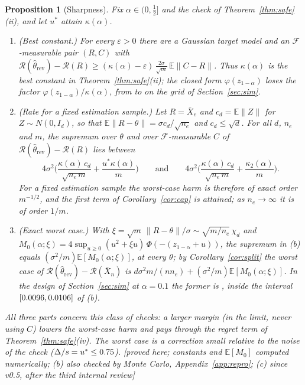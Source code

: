 \documentclass[10pt,a4paper]{article}
\theoremstyle{plain}
\newtheorem{proposition}[theorem]{Proposition}
\theoremstyle{definition}
\theoremstyle{remark}
\newcommand{\E}{\mathbb{E}}
\newcommand{\risk}{\mathcal{R}}
\newcommand{\rev}{\mathrm{rev}}
\newcommand{\norm}[1]{\lVert #1\rVert}
\newcommand{\status}[1]{\textsf{\small [#1]}}
\begin{document}
\begin{proposition}[Sharpness]\label{prop:sharp}
Fix $\alpha\in(0,\tfrac12]$ and the check of Theorem~\ref{thm:safe}(ii), and let $u^\ast$ attain $\kappa(\alpha)$.
\begin{enumerate}[leftmargin=2em,label=(\alph*)]
\item \textup{(Best constant.)} For every $\varepsilon>0$ there are a Gaussian target model and an $\mathcal F$-measurable pair $(R,C)$ with $\risk(\hat\theta_\rev)-\risk(R)\ge(\kappa(\alpha)-\varepsilon)\,\frac{2\sigma}{\sqrt m}\,\E\norm{C-R}$. Thus $\kappa(\alpha)$ is the best constant in Theorem~\ref{thm:safe}(ii); the closed form $\varphi(z_{1-\alpha})$ loses the factor $\varphi(z_{1-\alpha})/\kappa(\alpha)$, from \InvRatioMin{} to \InvRatioMax{} on the grid of Section~\ref{sec:sim}.
\item \textup{(Rate for a fixed estimation sample.)} Let $R=\bar X_e$ and $c_d=\E\norm Z$ for $Z\sim N(0,I_d)$, so that $\E\norm{R-\theta}=\sigma c_d/\sqrt{n_e}$ and $c_d\le\sqrt d$. For all $d$, $n_e$ and $m$, the supremum over $\theta$ and over $\mathcal F$-measurable $C$ of $\risk(\hat\theta_\rev)-\risk(R)$ lies between
\[
4\sigma^2\Big(\frac{\kappa(\alpha)\,c_d}{\sqrt{n_e\,m}}+\frac{u^\ast\kappa(\alpha)}{m}\Big)\qquad\text{and}\qquad 4\sigma^2\Big(\frac{\kappa(\alpha)\,c_d}{\sqrt{n_e\,m}}+\frac{\kappa_2(\alpha)}{m}\Big).
\]
For a fixed estimation sample the worst-case harm is therefore of exact order $m^{-1/2}$, and the first term of Corollary~\ref{cor:cap} is attained; as $n_e\to\infty$ it is of order $1/m$.
\item \textup{(Exact worst case.)} With $\xi=\sqrt m\,\norm{R-\theta}/\sigma\sim\sqrt{m/n_e}\,\chi_d$ and $M_0(\alpha;\xi)=4\sup_{u\ge0}(u^2+\xi u)\,\Phi(-(z_{1-\alpha}+u))$, the supremum in (b) equals $(\sigma^2/m)\E[M_0(\alpha;\xi)]$, at every $\theta$; by Corollary~\ref{cor:split} the worst case of $\risk(\hat\theta_\rev)-\risk(\bar X_n)$ is $d\sigma^2m/(nn_e)+(\sigma^2/m)\E[M_0(\alpha;\xi)]$. In the design of Section~\ref{sec:sim} at $\alpha=0.1$ the former is \WorstExactTen, inside the interval $[0.0096,0.0106]$ of (b).
\end{enumerate}
All three parts concern this class of checks: a larger margin (in the limit, never using $C$) lowers the worst-case harm and pays through the regret term of Theorem~\ref{thm:safe}(iv). The worst case is a correction \emph{small} relative to the noise of the check ($\Delta/s=u^\ast\le0.75$). \status{proved here; constants and $\E[M_0]$ computed numerically; (b) also checked by Monte Carlo, Appendix~\ref{app:repro}; (c) since v0.5, after the third internal review}
\end{proposition}
\end{document}
